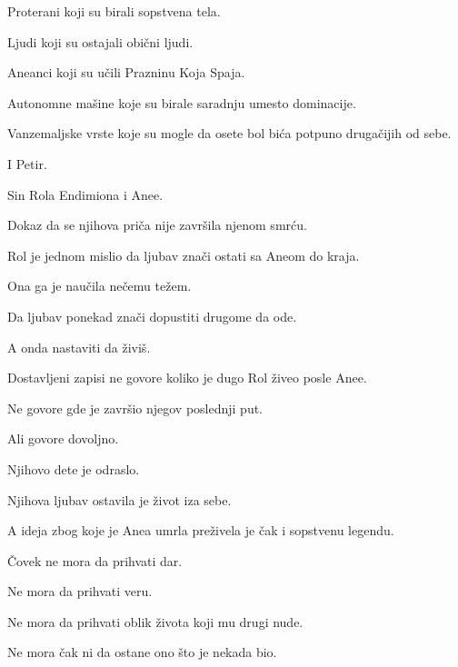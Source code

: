 Proterani koji su birali sopstvena tela.

Ljudi koji su ostajali obični ljudi.

Aneanci koji su učili Prazninu Koja Spaja.

Autonomne mašine koje su birale saradnju umesto dominacije.

Vanzemaljske vrste koje su mogle da osete bol bića potpuno drugačijih od sebe.

\bigskip

I Petir.

\bigskip

Sin Rola Endimiona i Anee.

\bigskip

Dokaz da se njihova priča nije završila njenom smrću.

\bigskip

Rol je jednom mislio da ljubav znači ostati sa Aneom do kraja.

\bigskip

Ona ga je naučila nečemu težem.

\bigskip

Da ljubav ponekad znači dopustiti drugome da ode.

A onda nastaviti da živiš.

\bigskip

Dostavljeni zapisi ne govore koliko je dugo Rol živeo posle Anee.

\bigskip

Ne govore gde je završio njegov poslednji put.

\bigskip

Ali govore dovoljno.

\bigskip

Njihovo dete je odraslo.

\bigskip

Njihova ljubav ostavila je život iza sebe.

\bigskip

A ideja zbog koje je Anea umrla preživela je čak i sopstvenu legendu.

\bigskip

Čovek ne mora da prihvati dar.

\bigskip

Ne mora da prihvati veru.

Ne mora da prihvati oblik života koji mu drugi nude.

\bigskip

Ne mora čak ni da ostane ono što je nekada bio.

